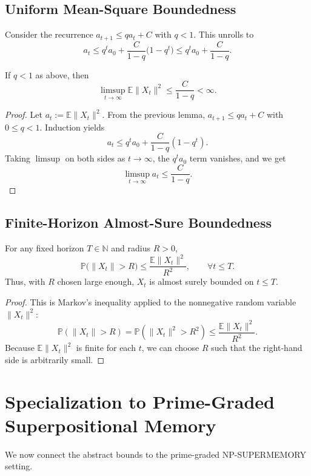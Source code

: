 \documentclass[11pt]{article}
\begin{document}
\subsection{Uniform Mean-Square Boundedness}

Consider the recurrence $a_{t+1}\le q a_t + C$ with $q<1$. This unrolls to
\[
a_t \le q^t a_0 + \frac{C}{1-q}\big(1-q^t\big)\le q^t a_0 + \frac{C}{1-q}.
\]

\begin{theorem}
If $q<1$ as above, then
\[
\limsup_{t\to\infty} \mathbb{E}\|X_t\|^2 \le \frac{C}{1-q} < \infty.
\]
\end{theorem}

\begin{proof}
Let $a_t := \mathbb{E}\|X_t\|^2$. From the previous lemma, $a_{t+1}\le q a_t + C$ with $0\le q<1$. Induction yields
\[
a_t \le q^t a_0 + \frac{C}{1-q}(1-q^t).
\]
Taking $\limsup$ on both sides as $t\to\infty$, the $q^t a_0$ term vanishes, and we get
\[
\limsup_{t\to\infty} a_t \le \frac{C}{1-q}.
\]
\end{proof}

\subsection{Finite-Horizon Almost-Sure Boundedness}

\begin{corollary}
For any fixed horizon $T\in\mathbb{N}$ and radius $R>0$,
\[
\mathbb{P}\big(\|X_t\| > R\big) \le \frac{\mathbb{E}\|X_t\|^2}{R^2},\qquad \forall t\le T.
\]
Thus, with $R$ chosen large enough, $X_t$ is almost surely bounded on $t\le T$.
\end{corollary}

\begin{proof}
This is Markov's inequality applied to the nonnegative random variable $\|X_t\|^2$:
\[
\mathbb{P}(\|X_t\| > R) = \mathbb{P}(\|X_t\|^2 > R^2) \le \frac{\mathbb{E}\|X_t\|^2}{R^2}.
\]
Because $\mathbb{E}\|X_t\|^2$ is finite for each $t$, we can choose $R$ such that the right-hand side is arbitrarily small.
\end{proof}

\section{Specialization to Prime-Graded Superpositional Memory}

We now connect the abstract bounds to the prime-graded NP-SUPERMEMORY setting.
\end{document}
